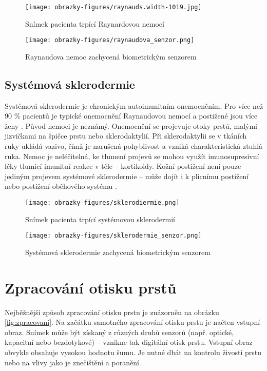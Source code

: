 \begin{figure}[!htbp]
  \begin{minipage}[b]{0.5\linewidth}
    \centering
    \texttt{[image: obrazky-figures/raynauds.width-1019.jpg]}
    \caption{Snímek pacienta trpící Raynardovou nemocí \cite{NHSRaynauds}}
  \end{minipage}
  \hspace{0.5cm}
  \begin{minipage}[b]{0.5\linewidth}
    \centering
    \texttt{[image: obrazky-figures/raynaudova\_senzor.png]}
    \caption{Raynaudova nemoc zachycená biometrickým senzorem \cite{Barotova}}
  \end{minipage}
\end{figure}
\subsection{Systémová sklerodermie}
Systémová sklerodermie je chronickým autoimunitním onemocněním. Pro více než 90 \% pacientů je typické onemocnění Raynaudovou nemocí a postižené jsou více ženy \cite{InfluenceSkinDiseases}. Původ nemoci je neznámý. Onemocnění se projevuje otoky prstů, malými jizvičkami na špičce prstu nebo sklerodaktylií. Při sklerodaktylii se v tkáních ruky ukládá vazivo, čímž je narušená pohyblivost a vzniká charakteristická ztuhlá ruka. Nemoc je neléčitelná, ke tlumení projevů se mohou využít imunosupresivní léky tlumící imunitní reakce v těle -- kortikoidy. Kožní postižení není pouze jediným projevem systémové sklerodermie -- může dojít i k plicnímu postižení nebo postižení oběhového systému \cite{SystemovaSklerodermie}. 

\begin{figure}[!htbp]
  \begin{minipage}[b]{0.5\linewidth}
    \centering
    \texttt{[image: obrazky-figures/sklerodiermie.png]}
    \caption{Snímek pacienta trpící systémovou sklerodermií \cite{InfluenceSkinDiseases}}
  \end{minipage}
  \hspace{0.5cm}
  \begin{minipage}[b]{0.5\linewidth}
    \centering
    \texttt{[image: obrazky-figures/sklerodermie\_senzor.png]}
    \caption{Systémová sklerodermie zachycená biometrickým senzorem \cite{Barotova}}
  \end{minipage}
\end{figure}

\section{Zpracování otisku prstů}
Nejběžnější způsob zpracování otisku prstu je znázorněn na obrázku \ref{fig:zpracovani}. Na začátku samotného zpracování otisku prstu je načten vstupní obraz. Snímek může být získaný z různých druhů senzorů (např. optické, kapacitní nebo bezdotykové) -- vznikne tak digitální otisk prstu. Vstupní obraz obvykle obsahuje vysokou hodnotu šumu. Je nutné dbát na kontrolu živosti prstu nebo na vlivy jako je znečištění a poranění.

